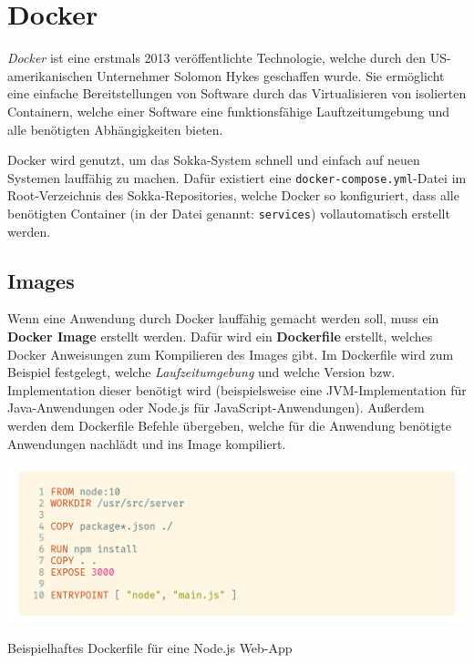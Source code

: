 \section{Docker}

\textit{Docker} ist eine erstmals 2013 veröffentlichte Technologie, welche durch den US-amerikanischen Unternehmer Solomon Hykes geschaffen wurde. \cite{hykes2018} Sie ermöglicht eine einfache Bereitstellungen von Software durch das Virtualisieren von isolierten Containern, welche einer Software eine funktionsfähige Lauftzeitumgebung und alle benötigten Abhängigkeiten bieten.

Docker wird genutzt, um das Sokka-System schnell und einfach auf neuen Systemen lauffähig zu machen. Dafür existiert eine \lstinline{docker-compose.yml}-Datei im Root-Verzeichnis des Sokka-Repositories, welche Docker so konfiguriert, dass alle benötigten Container (in der Datei genannt: \lstinline{services}) vollautomatisch erstellt werden.

\subsection{Images}

Wenn eine Anwendung durch Docker lauffähig gemacht werden soll, muss ein \textbf{Docker Image} erstellt werden. Dafür wird ein \textbf{Dockerfile} erstellt, welches Docker Anweisungen zum Kompilieren des Images gibt. Im Dockerfile wird zum Beispiel festgelegt, welche \textit{Laufzeitumgebung} und welche Version bzw. Implementation dieser benötigt wird (beispielsweise eine JVM-Implementation für Java-Anwendungen oder Node.js für JavaScript-Anwendungen). Außerdem werden dem Dockerfile Befehle übergeben, welche für die Anwendung benötigte Anwendungen nachlädt und ins Image kompiliert.

\begin{code}[htp]
    \begin{center}
        \includegraphics[width=1\textwidth]{images/Docker/dockerfile.png}
        \vspace{-25pt}
        \caption{Beispielhaftes Dockerfile für eine Node.js Web-App}
    \end{center}
\end{code}

